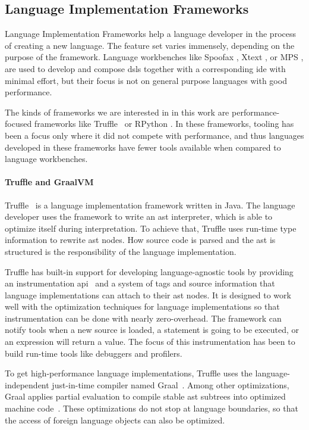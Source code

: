 \documentclass[sigplan,10pt,review,anonymous]{acmart}
\begin{document}
\subsection{Language Implementation Frameworks}

Language Implementation Frameworks help a language developer in the process of
creating a new language. The feature set varies immensely, depending on the
purpose of the framework. Language workbenches like Spoofax
\cite{kats2010spoofax}, Xtext \cite{eysholdt2010xtext}, or MPS
\cite{voelter2012language}, are used to develop and compose \acp{dsl} together
with a corresponding \ac{ide} with minimal effort, but their focus is not on
general purpose languages with good performance.

The kinds of frameworks we are interested in in this work are
performance-focused frameworks like Truffle~\cite{wimmer2012truffle} or RPython
\cite{ancona2007rpython}. In these frameworks, tooling has been a focus only
where it did not compete with performance, and thus languages developed in these
frameworks have fewer tools available when compared to language workbenches.

\paragraph{Truffle and GraalVM}
Truffle~\cite{wimmer2012truffle} is a language implementation framework written
in Java. The language developer uses the framework to write an \ac{ast}
interpreter, which is able to optimize itself during interpretation. To achieve
that, Truffle uses run-time type information to rewrite \ac{ast} nodes. How
source code is parsed and the \ac{ast} is structured is the responsibility of
the language implementation.

Truffle has built-in support for developing language-agnostic tools by providing
an instrumentation \ac{api}~\cite{van2015building} and a system of tags and
source information that language implementations can attach to their \ac{ast}
nodes. It is designed to work well with the optimization techniques for language
implementations so that instrumentation can be done with nearly
zero-overhead. The framework can notify tools when a new source is loaded, a
statement is going to be executed, or an expression will return a value. The
focus of this instrumentation has been to build run-time tools like debuggers
and profilers.

To get high-performance language implementations, Truffle uses the
language-independent just-in-time compiler named
Graal~\cite{wurthinger2013one}. Among other optimizations, Graal applies partial
evaluation to compile stable \ac{ast} subtrees into optimized machine
code~\cite{wurthinger2017practical}. These optimizations do not stop at language
boundaries, so that the access of foreign language objects can also be
optimized.
\end{document}
